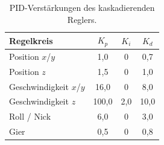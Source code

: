 \label{app:pid}

\begin{table}[H]
  \centering
  \caption{PID-Verstärkungen des kaskadierenden Reglers.}
  \label{tab:app_pid_gains}
  \begin{tabular}{l c c c}
    \toprule
    Regelkreis & $K_p$ & $K_i$ & $K_d$ \\
    \midrule
    Position $x$/$y$         & 1{,}0   & 0     & 0{,}7  \\
    Position $z$             & 1{,}5   & 0     & 1{,}0  \\
    Geschwindigkeit $x$/$y$  & 16{,}0  & 0     & 8{,}0  \\
    Geschwindigkeit $z$      & 100{,}0 & 2{,}0 & 10{,}0 \\
    Roll / Nick              & 6{,}0   & 0     & 3{,}0  \\
    Gier                     & 0{,}5   & 0     & 0{,}8  \\
    \bottomrule
  \end{tabular}
\end{table}
